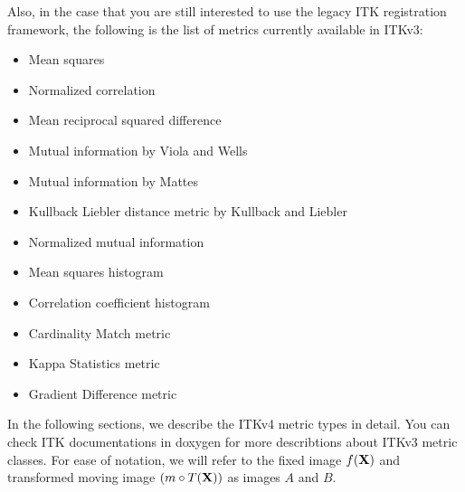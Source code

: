 Also, in the case that you are still interested to use the legacy ITK registration framework,
the following is the list of metrics currently available in ITKv3:
\begin{itemize}
\item Mean squares\\ 
\item Normalized correlation \\ 
\item Mean reciprocal squared difference \\ 
\item Mutual information by Viola and Wells \\ 
\item Mutual information by Mattes \\ 
\item Kullback Liebler distance metric by Kullback and Liebler \\ 
\item Normalized mutual information \\ 
\item Mean squares histogram \\ 
\item Correlation coefficient histogram \\ 
\item Cardinality Match metric \\ 
\item Kappa Statistics metric\\ 
\item Gradient Difference metric \\ 
\end{itemize}

In the following sections, we describe the ITKv4 metric types in detail.
You can check ITK documentations in doxygen for more describtions about
ITKv3 metric classes.
For ease of notation, we will refer to the fixed image $f(\bf{X})$
and transformed moving image $(m \circ T(\bf{X}))$ as images $A$ and $B$.

